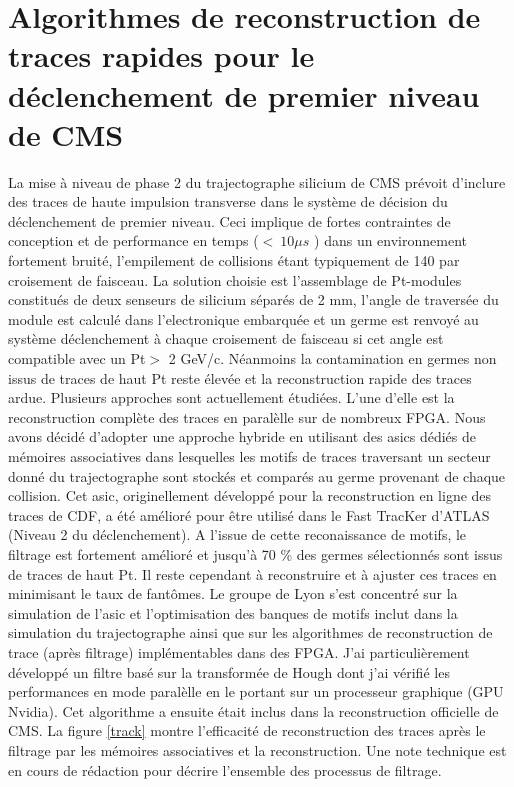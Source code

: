 \documentclass[11pt,french]{article}
\begin{document}
\section*{Algorithmes de reconstruction de traces rapides pour le d\'eclenchement de premier niveau de CMS} 

La mise \`a niveau  de phase 2 du trajectographe silicium de CMS pr\'evoit d'inclure des traces de haute impulsion transverse dans le syst\`eme de d\'ecision du d\'eclenchement de premier niveau. Ceci implique de fortes contraintes de conception et de performance en temps ($< ~ 10 \mu s$ ) dans un environnement fortement bruit\'e, l'empilement de collisions \'etant typiquement de 140 par croisement de faisceau. La solution choisie est l'assemblage de Pt-modules constitu\'es de deux senseurs de silicium s\'epar\'es de 2 mm, l'angle de travers\'ee du module est calcul\'e dans l'electronique embarqu\'ee et un germe est renvoy\'e au syst\`eme d\'eclenchement  \`a chaque croisement de faisceau si cet angle est compatible avec un Pt$>$ 2 GeV/c. N\'eanmoins la contamination en germes non issus de traces de haut Pt reste \'elev\'ee et la reconstruction rapide des traces ardue. Plusieurs approches sont actuellement \'etudi\'ees. L'une d'elle est la reconstruction compl\`ete des traces en paral\`elle sur de nombreux FPGA. Nous avons d\'ecid\'e d'adopter une approche hybride en utilisant des asics d\'edi\'es de m\'emoires associatives dans lesquelles les motifs de traces traversant un secteur donn\'e du trajectographe sont stock\'es et compar\'es au germe provenant de chaque collision. Cet asic, originellement d\'evelopp\'e pour la reconstruction en ligne des traces de CDF, a \'et\'e am\'elior\'e pour \^etre utilis\'e dans le Fast TracKer d'ATLAS (Niveau 2 du d\'eclenchement). A l'issue de cette reconaissance de motifs, le filtrage est fortement
am\'elior\'e et jusqu'\`a 70 \% des germes s\'electionn\'es sont issus de traces de haut Pt. Il reste cependant \`a reconstruire et \`a ajuster ces traces en minimisant le taux de fant\^omes. Le groupe de Lyon s'est concentr\'e sur la simulation de l'asic et l'optimisation des banques de motifs inclut dans la simulation du trajectographe ainsi que sur les algorithmes de reconstruction de trace (apr\`es filtrage) impl\'ementables dans des FPGA. J'ai particuli\`erement d\'evelopp\'e un filtre bas\'e sur la transform\'ee de Hough dont j'ai v\'erifi\'e les performances en mode paral\`elle en le portant sur un processeur graphique (GPU Nvidia). Cet algorithme a ensuite \'etait inclus dans la reconstruction officielle de CMS. La figure \ref{track} montre l'efficacit\'e de reconstruction des traces apr\`es le filtrage par les m\'emoires associatives et la reconstruction. Une note technique est en cours de r\'edaction pour d\'ecrire l'ensemble des processus de filtrage.
\end{document}
